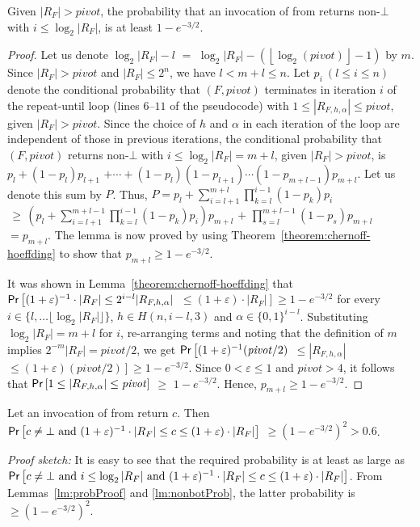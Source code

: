 \begin{lemma}\label{lm:nonbotProb}
Given $|R_F| > \mathit{pivot}$, the probability that an invocation of
{\ApproxMCCore} from {\ApproxMC} returns non-$\bot$ with $i \le \log_2
|R_F|$, is at least $1-e^{-3/2}$.
\end{lemma}
\begin{proof}
Let us denote $\log_2 |R_F| - l$ $=$ $\log_2 |R_F| -
(\left\lfloor\log_2 (\mathit{pivot}) \right\rfloor - 1)$ by $m$.  
Since $|R_F| > \mathit{pivot}$ and $|R_F| \le 2^n$, we have $l < m+l \le n$.
%
%
%
%
%
Let $p_i~(l \le i \le n)$ denote the conditional probability that
{\ApproxMCCore}$(F, \mathit{pivot})$ terminates in iteration $i$ of
the repeat-until loop (lines $6$--$11$ of the pseudocode) with $1 \le
|R_{F,h,\alpha}| \le \mathit{pivot}$, given $|R_F| > \mathit{pivot}$.
Since the choice of $h$ and $\alpha$ in each iteration of the loop are
independent of those in previous iterations, the conditional
probability that {\ApproxMCCore}$(F, \mathit{pivot})$ returns
non-$\bot$ with $i \le \log_2 |R_F| = m+l$, given $|R_F| >
\mathit{pivot}$, is $p_l + (1-p_l)p_{l+1}$ $+ \cdots +
(1-p_l)(1-p_{l+1})\cdots(1-p_{m+l-1})p_{m+l}$. Let us denote this sum
by $P$.  Thus, $P = p_l + \sum_{i=l+1}^{m+l} \prod_{k=l}^{i-1}
(1-p_k)p_i$ $\,\ge\, \left(p_l + \sum_{i=l+1}^{m+l-1}
\prod_{k=l}^{i-1} (1-p_k)p_i\right)p_{m+l}$ $+$ $\prod_{s=l}^{m+l-1}
(1-p_s)p_{m+l}$ $= p_{m+l}$.  The lemma is now proved by using
Theorem~\ref{theorem:chernoff-hoeffding} to show that $p_{m+l} \ge
1-e^{-3/2}$.

It was shown in Lemma~\ref{theorem:chernoff-hoeffding} that
$\mathsf{Pr}\left[(1+\varepsilon)^{-1}\cdot |R_F| \leq
  2^{i-l}|R_{F,h,\alpha}|\right.$ $\left.\leq (1+ \varepsilon)\cdot
  |R_F| \right] \ge 1- e^{-3/2}$ for every $i \in \{l, \ldots \lfloor \log_2
|R_F| \rfloor\}$, $h \in H(n, i-l, 3)$ and $\alpha \in \{0,1\}^{i-l}$.
Substituting $\log_2 |R_F| = m+l$ for $i$, re-arranging terms and
noting that the definition of $m$ implies $2^{-m}|R_F| =
\mathit{pivot}/2$, we get
$\mathsf{Pr}\left[(1+\varepsilon)^{-1}(\mathit{pivot}/2)\right.$
  $\left. \leq |R_{F,h,\alpha}|\right.$ $\left.\leq (1+
  \varepsilon)(\mathit{pivot}/2) \right] \ge 1- e^{-3/2}$.  Since $0 <
\varepsilon \le 1$ and $\mathit{pivot} > 4$, it follows that
$\mathsf{Pr}\left[1 \le |R_{F,h,\alpha}| \le \mathit{pivot}\right]$ $\ge$
$1-e^{-3/2}$.  Hence, $p_{m+l} \ge 1-e^{-3/2}$.
\end{proof}

\begin{theorem}\label{thm:almost-approx}
Let an invocation of {\ApproxMCCore} from {\ApproxMC} return $c$. Then
$\mathsf{Pr}\left[c \neq \bot \mbox{ and } (1 + \varepsilon)^{-1}\cdot |R_F| \le c
  \le (1 + \varepsilon)\cdot |R_F|\right]$ $\ge (1 - e^{-3/2})^2 > 0.6$.
\end{theorem}
\noindent \emph{Proof sketch:} It is easy to see that the required
probability is at least as large as $\mathsf{Pr}\left[c \neq \bot \mbox{ and
  } i \leq \log_2|R_F| \mbox{ and } (1 + \varepsilon)^{-1}\cdot |R_F|
  \le c \le (1 + \varepsilon)\cdot |R_F|\right]$. From
Lemmas~\ref{lm:probProof} and \ref{lm:nonbotProb}, the latter
probability is $\ge (1 - e^{-3/2})^2$.

